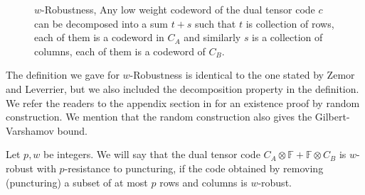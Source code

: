 \begin{figure}[H]
  \label{fig:wrobustf}
            \caption{$w$-Robustness, Any low weight codeword of the dual tensor code $c$ can be decomposed into a sum $t+s$ such that $t$ is collection of rows, each of them is a codeword in $C_{A}$ and similarly $s$ is a collection of columns, each of them is a codeword of $C_{B}$. }
\end{figure}



The definition we gave for $w$-Robustness is identical to the one stated by Zemor and Leverrier, but we also included the decomposition property in the definition. We refer the readers to the appendix section in \cite{leverrier2022quantum} for an existence proof by random construction. We mention that the random construction also gives the Gilbert-Varshamov bound.

\begin{definition} Let $p,w$ be integers. We will say that the dual tensor code $C_{A} \otimes \mathbb{F} + \mathbb{F} \otimes C_{B}$ is $w$-robust with $p$-resistance to puncturing, if the code obtained by removing (puncturing) a subset of at most $p$ rows and columns is $w$-robust.   
\end{definition}

